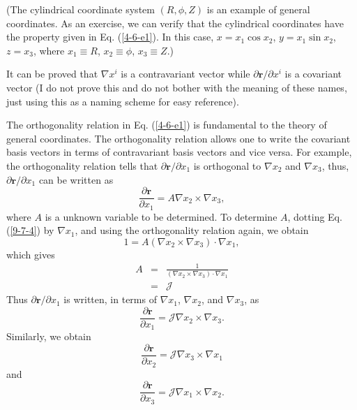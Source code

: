 \documentclass{article}
\begin{document}
(The cylindrical coordinate system $(R, \phi, Z)$ is an example of general
coordinates. As an exercise, we can verify that the cylindrical coordinates
have the property given in Eq. (\ref{4-6-e1}). In this case, $x = x_1 \cos
x_2$, $y = x_1 \sin x_2$, $z = x_3$, where $x_1 \equiv R$, $x_2 \equiv \phi$,
$x_3 \equiv Z$.)

It can be proved that $\nabla x^i$ is a contravariant vector while $\partial
\mathbf{r}/ \partial x^i$ is a covariant vector (I do not prove this and do
not bother with the meaning of these names, just using this as a naming scheme
for easy reference).

The orthogonality relation in Eq. (\ref{4-6-e1}) is fundamental to the theory
of general coordinates. The orthogonality relation allows one to write the
covariant basis vectors in terms of contravariant basis vectors and vice
versa. For example, the orthogonality relation tells that $\partial
\mathbf{r}/ \partial x_1$ is orthogonal to $\nabla x_2$ and $\nabla x_3$,
thus, $\partial \mathbf{r}/ \partial x_1$ can be written as
\begin{equation}
  \label{9-7-4} \frac{\partial \mathbf{r}}{\partial x_1} = A \nabla x_2 \times
  \nabla x_3,
\end{equation}
where $A$ is a unknown variable to be determined. To determine $A$, dotting
Eq. (\ref{9-7-4}) by $\nabla x_1$, and using the orthogonality relation again,
we obtain
\begin{equation}
  1 = A (\nabla x_2 \times \nabla x_3) \cdot \nabla x_1,
\end{equation}
which gives
\begin{eqnarray}
  A & = & \frac{1}{(\nabla x_2 \times \nabla x_3) \cdot \nabla x_1}
  \nonumber\\
  & = & \mathcal{J} 
\end{eqnarray}
Thus $\partial \mathbf{r}/ \partial x_1$ is written, in terms of $\nabla x_1$,
$\nabla x_2$, and $\nabla x_3$, as
\begin{equation}
  \label{9-8-1} \frac{\partial \mathbf{r}}{\partial x_1} =\mathcal{J} \nabla
  x_2 \times \nabla x_3 .
\end{equation}
Similarly, we obtain
\begin{equation}
  \label{9-8-2} \frac{\partial \mathbf{r}}{\partial x_2} =\mathcal{J} \nabla
  x_3 \times \nabla x_1
\end{equation}
and
\begin{equation}
  \label{9-8-3} \frac{\partial \mathbf{r}}{\partial x_3} =\mathcal{J} \nabla
  x_1 \times \nabla x_2 .
\end{equation}
\end{document}
